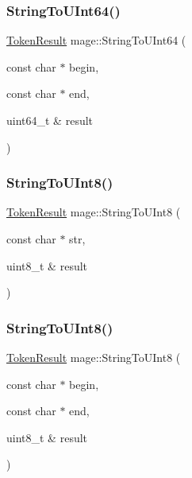 \hypertarget{namespacemage_a8e3b6a19a6ab9e7c905150352b8ab0ea}{}\label{namespacemage_a8e3b6a19a6ab9e7c905150352b8ab0ea} 
\subsubsection{\texorpdfstring{String\+To\+U\+Int64()}{StringToUInt64()}\hspace{0.1cm}{\footnotesize\ttfamily [2/2]}}
{\footnotesize\ttfamily \hyperlink{namespacemage_a2178ba2411db5912f41b2e7698c2037d}{Token\+Result} mage\+::\+String\+To\+U\+Int64 (\begin{DoxyParamCaption}\item[{const char $\ast$}]{begin,  }\item[{const char $\ast$}]{end,  }\item[{uint64\+\_\+t \&}]{result }\end{DoxyParamCaption})}

\hypertarget{namespacemage_ad3cfd1fdffefa1f3f793b7612de11770}{}\label{namespacemage_ad3cfd1fdffefa1f3f793b7612de11770} 
\subsubsection{\texorpdfstring{String\+To\+U\+Int8()}{StringToUInt8()}\hspace{0.1cm}{\footnotesize\ttfamily [1/2]}}
{\footnotesize\ttfamily \hyperlink{namespacemage_a2178ba2411db5912f41b2e7698c2037d}{Token\+Result} mage\+::\+String\+To\+U\+Int8 (\begin{DoxyParamCaption}\item[{const char $\ast$}]{str,  }\item[{uint8\+\_\+t \&}]{result }\end{DoxyParamCaption})}

\hypertarget{namespacemage_ae6af1c0b282e0858fe4376325b4d06c6}{}\label{namespacemage_ae6af1c0b282e0858fe4376325b4d06c6} 
\subsubsection{\texorpdfstring{String\+To\+U\+Int8()}{StringToUInt8()}\hspace{0.1cm}{\footnotesize\ttfamily [2/2]}}
{\footnotesize\ttfamily \hyperlink{namespacemage_a2178ba2411db5912f41b2e7698c2037d}{Token\+Result} mage\+::\+String\+To\+U\+Int8 (\begin{DoxyParamCaption}\item[{const char $\ast$}]{begin,  }\item[{const char $\ast$}]{end,  }\item[{uint8\+\_\+t \&}]{result }\end{DoxyParamCaption})}

